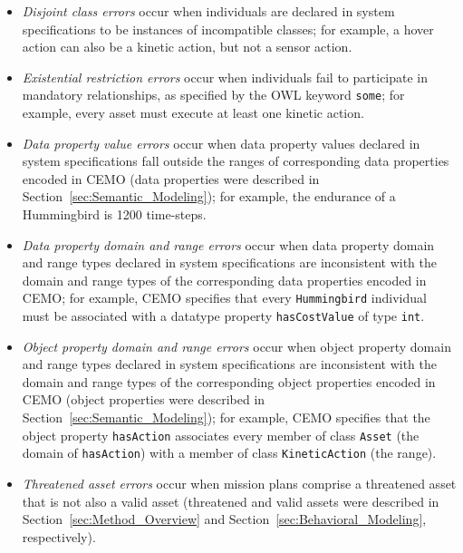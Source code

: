\begin{itemize}

\item \emph{Disjoint class errors} occur when individuals are declared in system specifications to be instances of incompatible classes; for example, a hover action can also be a kinetic action, but not a sensor action.

\item \emph{Existential restriction errors} occur when individuals fail to participate in mandatory relationships, as specified by the OWL keyword \texttt{some}; for example, every asset must execute at least one kinetic action.

\item \emph{Data property value errors} occur when data property values declared in system specifications fall outside the ranges of corresponding data properties encoded in CEMO (data properties were described in Section~\ref{sec:Semantic_Modeling}); for example, the endurance of a Hummingbird is 1200 time-steps.

\item \emph{Data property domain and range errors} occur when data property domain and range types declared in system specifications are inconsistent with the domain and range types of the corresponding data properties encoded in CEMO; for example, CEMO specifies that every \texttt{Hummingbird} individual must be associated with a datatype property \texttt{hasCostValue} of type \texttt{int}.

\item \emph{Object property domain and range errors} occur when object property domain and range types declared in system specifications are inconsistent with the domain and range types of the corresponding object properties encoded in CEMO (object properties were described in Section~\ref{sec:Semantic_Modeling}); for example, CEMO specifies that the object property \texttt{hasAction} associates every member of class \texttt{Asset} (the domain of \texttt{hasAction}) with a member of class \texttt{KineticAction} (the range).

\item \emph{Threatened asset errors} occur when mission plans comprise a threatened asset that is not also a valid asset (threatened and valid assets were described in Section~\ref{sec:Method_Overview} and Section~\ref{sec:Behavioral_Modeling}, respectively).

\end{itemize}

